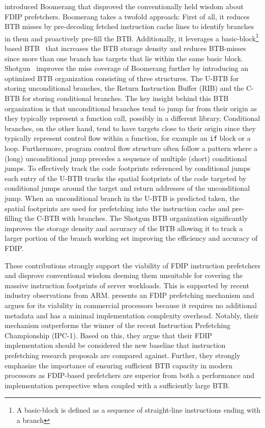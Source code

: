 \documentclass[../main.tex]{subfiles}
\begin{document}
\begin{refsection}
\textcite{kumar17_boomer} introduced Boomerang that disproved the
conventionally held wisdom about FDIP prefetchers. Boomerang takes a
twofold approach: First of all, it reduces BTB misses by pre-decoding
fetched instruction cache lines to identify branches in them and
proactively pre-fill the BTB. Additionally, it leverages a
basic-block\footnote{A basic-block is defined as a sequence of
  straight-line instructions ending with a branch} based
BTB~\cite{yeh92_compr_instr_fetch_mechan_for} that increases the BTB
storage density and reduces BTB-misses since more than one branch has
targets that lie within the same basic
block. Shotgun~\cite{kumar18_blast_throug_front_end_bottl_with_shotg,kumar20_shoot_down_server_front_end_bottl}
improves the miss coverage of Boomerang further by introducing an
optimized BTB organization consisting of three structures. The U-BTB
for storing unconditional branches, the Return Instruction Buffer
(RIB) and the C-BTB for storing conditional branches. The key insight
behind this BTB organization is that unconditional branches tend to
jump far from their origin as they typically represent a function
call, possibly in a different library. Conditional branches, on the
other hand, tend to have targets close to their origin since they
typically represent control flow within a function, for example an
\texttt{if} block or a loop. Furthermore, program control flow
structure often follow a pattern where a (long) unconditional jump
precedes a sequence of multiple (short) conditional jumps. To
effectively track the code footprints referenced by conditional jumps
each entry of the U-BTB tracks the spatial footprints of the code
targeted by conditional jumps around the target and return addresses
of the unconditional jump. When an unconditional branch in the U-BTB
is predicted taken, the spatial footprints are used for prefetching
into the instruction cache and pre-filling the C-BTB with
branches. The Shotgun BTB organization significantly improves the
storage density and accuracy of the BTB allowing it to track a larger
portion of the branch working set improving the efficiency and
accuracy of FDIP.

These contributions strongly support the viability of FDIP instruction
prefetchers and disprove conventional wisdom deeming them unsuitable
for covering the massive instruction footprints of server
workloads. This is supported by recent industry observations from
ARM. \textcite{ishii21_re_fetch_direc_instr_prefet} presents an FDIP
prefetching mechanism and argues for its viability in commercial
processors because it requires no additional metadata and has a
minimal implementation complexity overhead. Notably, their mechanism
outperforms the winner of the recent Instruction Prefetching
Championship (IPC-1). Based on this, they argue that their FDIP
implementation should be considered the new baseline that instruction
prefetching research proposals are compared against. Further, they
strongly emphasize the importance of ensuring sufficient BTB capacity
in modern processors as FDIP-based prefetchers are superior from both
a performance and implementation perspective when coupled with a
sufficiently large BTB.





\end{refsection}
\end{document}
